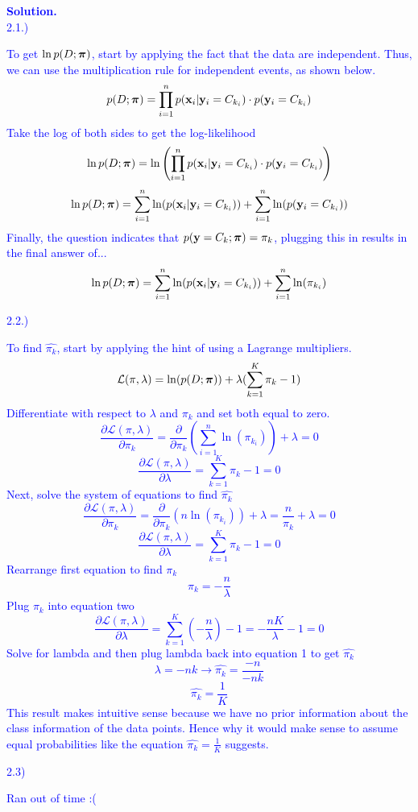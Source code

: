 \documentclass[submit]{harvardml}
\begin{document}
  \textcolor{blue}{\textbf{Solution.\\}
  2.1.)
  \begin{center}
      To get $\ln p(D ; \boldsymbol{\pi})$, start by applying the fact that the data are independent. Thus, we can use the multiplication rule for independent events, as shown below.
      $$ p(D ; \boldsymbol{\pi}) = \prod_{i=1}^n p(\mathbf{x}_i|\mathbf{y}_i=C_{k_i}) \cdot p(\mathbf{y}_i=C_{k_i})$$
      Take the log of both sides to get the log-likelihood \\
      $$ \ln p(D ; \boldsymbol{\pi}) = \ln \left(\prod_{i=1}^n p(\mathbf{x}_i|\mathbf{y}_i=C_{k_i}) \cdot p(\mathbf{y}_i=C_{k_i})\right)$$
      $$ \ln p(D ; \boldsymbol{\pi}) =  \sum_{i=1}^n \ln(p(\mathbf{x}_i|\mathbf{y}_i=C_{k_i})) +  \sum_{i=1}^n \ln(p(\mathbf{y}_i=C_{k_i}))$$
      Finally, the question indicates that $p(\mathbf{y} = C_k; \boldsymbol{\pi}) = \pi_k$, plugging this in results in the final answer of...
      $$ \ln p(D ; \boldsymbol{\pi}) =  \sum_{i=1}^n \ln(p(\mathbf{x}_i|\mathbf{y}_i=C_{k_i})) +  \sum_{i=1}^n \ln(\pi_{k_{i}}) $$
  \end{center}
  2.2.)
  \begin{center}
      To find $\hat{\pi_k}$, start by applying the hint of using a Lagrange multipliers.
      $$ \mathcal{L}(\pi, \lambda) = \ln (p (D; \boldsymbol{\pi})) + \lambda (\sum_{k=1}^K \pi_k - 1) $$
      Differentiate with respect to $\lambda$ and $\pi_k$ and set both equal to zero.
      $$ \frac{\partial \mathcal{L}(\pi, \lambda)}{\partial \pi_k} = \frac{\partial }{\partial \pi_k} \left( \sum_{i=1}^n \ln(\pi_{k_{i}})\right) + \lambda =0$$
      $$ \frac{\partial \mathcal{L}(\pi, \lambda)}{\partial \lambda} = \sum_{k=1}^K \pi_k - 1 =0$$
      Next, solve the system of equations to find $\hat{\pi_k}$
      $$ \frac{\partial \mathcal{L}(\pi, \lambda)}{\partial \pi_k} = \frac{\partial }{\partial \pi_k} \left(n \ln(\pi_{k_{i}})\right) + \lambda= \frac{n}{\pi_k} + \lambda =0$$
      $$ \frac{\partial \mathcal{L}(\pi, \lambda)}{\partial \lambda} = \sum_{k=1}^K \pi_k - 1 = 0$$
      Rearrange first equation to find $\pi_k$
      $$\pi_k = -\frac{n}{\lambda}$$
      Plug $\pi_k$ into equation two
      $$ \frac{\partial \mathcal{L}(\pi, \lambda)}{\partial \lambda} = \sum_{k=1}^K \left(-\frac{n}{\lambda}\right) - 1 = -\frac{nK}{\lambda} - 1 = 0$$
      Solve for lambda and then plug lambda back into equation 1 to get $\hat{\pi_k}$
      $$\lambda = -nk \rightarrow \hat{\pi_k} = \frac{-n}{-nk}$$
      $$ \hat{\pi_k} = \frac{1}{K}$$
      This result makes intuitive sense because we have no prior information about the class information of the data points. Hence why it would make sense to assume equal probabilities like the equation $\hat{\pi_k} = \frac{1}{K}$ suggests.
  \end{center}
  2.3) \\
  \begin{center}
      Ran out of time :(
  \end{center}
  }
\end{document}
